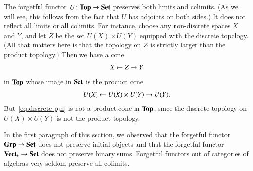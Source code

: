 \begin{example}
The forgetful functor $U\from \Tp \to \Set$%
%
%
%
preserves both limits and colimits.  (As we will see, this follows from the
fact that $U$ has adjoints on both sides.)  It does not reflect all limits
or all colimits.  For instance, choose any non-discrete spaces $X$ and $Y$,
and let $Z$ be the set $U(X) \times U(Y)$ equipped with the discrete
topology.  (All that matters here is that the topology on $Z$ is strictly
larger than the product topology.)  Then we have a cone
%
\begin{equation}
\label{eq:discrete-pjn}
X \leftarrow Z \to Y
\end{equation}
%
in $\mathbf{Top}$ whose image in $\mathbf{Set}$ is the product cone
\[
U(X) \leftarrow U(X) \times U(Y) \to U(Y).
\]
But~\eqref{eq:discrete-pjn} is not a product cone in $\mathbf{Top}$, since the
discrete topology on $U(X) \times U(Y)$ is not the product topology.
\end{example}

\begin{example}
In the first paragraph of this section, we observed that the forgetful
functor $\mathbf{Grp} \to \mathbf{Set}$%
%
%
does not preserve initial objects and that the forgetful functor $\mathbf{Vect}_k
\to \mathbf{Set}$%
%
%
does not preserve binary sums.  Forgetful functors out of categories of
algebras very seldom preserve all colimits.
\end{example}

